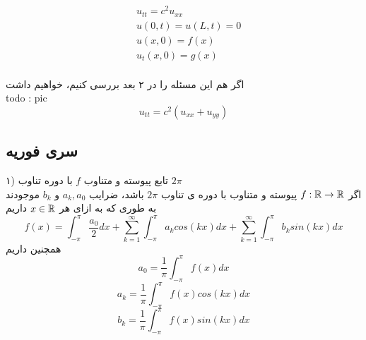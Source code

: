 \begin{equation*}
\begin{aligned}
{}&\ u_{tt}=c^2u_{xx} \\
&\ u(0,t)=u(L,t)=0 \\
&\ u(x,0)=f(x) \\
&\ u_t(x,0)=g(x) \\
\end{aligned}
\end{equation*}

اگر هم این مسئله را در ۲ بعد بررسی کنیم، خواهیم داشت\\
todo : pic\\
\[
u_{tt}=c^2(u_{xx}+u_{yy})
\]

\subsection*{سری فوریه}
۱) تابع پیوسته و متناوب
$f$
 با دوره تناوب
 $2\pi$\\
 اگر 
 $f:\mathbb{R}\to\mathbb{R}$
 پیوسته و متناوب با دوره ی تناوب 
 $2\pi$
 باشد، ضرایب
 $a_k,a_0$
 و
 $b_k$
 موجودند به طوری که به ازای هر
 $x\in\mathbb{R}$
 داریم
 \begin{equation}
 f(x)=\int_{-\pi}^\pi{\frac{a_0}{2}dx}+\sum_{k=1}^\infty {\int_{-\pi}^\pi{a_kcos(kx)dx}}+\sum_{k=1}^\infty{\int_{-\pi}^\pi{b_ksin(kx)dx}}
 \end{equation}
 همچنین داریم
 \begin{equation}
 a_0=\frac{1}{\pi}\int_{-\pi}^\pi {f(x)dx}
 \end{equation}
 \begin{equation}
 a_k=\frac{1}{\pi}\int_{-\pi}^\pi {f(x)cos(kx)dx}
 \end{equation}
  \begin{equation}
 b_k=\frac{1}{\pi}\int_{-\pi}^\pi {f(x)sin(kx)dx}
 \end{equation}
 
